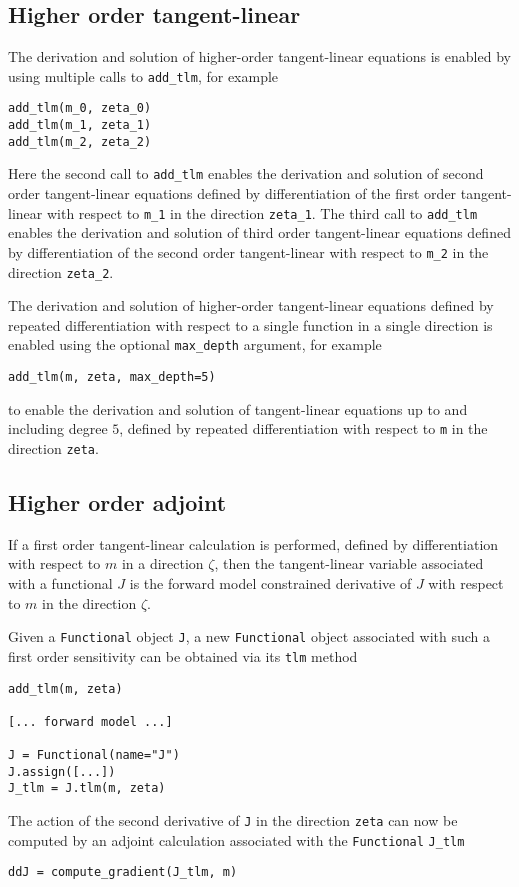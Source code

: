 \documentclass[11pt]{article}
\begin{document}
\subsection{Higher order tangent-linear}

The derivation and solution of higher-order tangent-linear equations is enabled
by using multiple calls to \texttt{add\_tlm}, for example
\begin{lstlisting}
add_tlm(m_0, zeta_0)
add_tlm(m_1, zeta_1)
add_tlm(m_2, zeta_2)
\end{lstlisting}
Here the second call to \texttt{add\_tlm} enables the derivation and solution
of second order tangent-linear equations defined by differentiation of the
first order tangent-linear with respect to \texttt{m\_1} in the direction
\texttt{zeta\_1}. The third call to \texttt{add\_tlm} enables the derivation
and solution of third order tangent-linear equations defined by differentiation
of the second order tangent-linear with respect to \texttt{m\_2} in the
direction \texttt{zeta\_2}.

The derivation and solution of higher-order tangent-linear equations defined by
repeated differentiation with respect to a single function in a single
direction is enabled using the optional \texttt{max\_depth} argument, for
example
\begin{lstlisting}
add_tlm(m, zeta, max_depth=5)
\end{lstlisting}
to enable the derivation and solution of tangent-linear equations up to and
including degree $5$, defined by repeated differentiation with respect to
\texttt{m} in the direction \texttt{zeta}.

\subsection{Higher order adjoint}\label{sect:higher_order_adjoint}

If a first order tangent-linear calculation is performed, defined by
differentiation with respect to $m$ in a direction $\zeta$, then the
tangent-linear variable associated with a functional $J$ is the forward model
constrained derivative of $J$ with respect to $m$ in the direction $\zeta$.

Given a \texttt{Functional} object \texttt{J}, a new \texttt{Functional} object
associated with such a first order sensitivity can be obtained via its
\texttt{tlm} method
\begin{lstlisting}
add_tlm(m, zeta)

[... forward model ...]

J = Functional(name="J")
J.assign([...])
J_tlm = J.tlm(m, zeta)
\end{lstlisting}
The action of the second derivative of \texttt{J} in the direction
\texttt{zeta} can now be computed by an adjoint calculation associated with the
\texttt{Functional} \texttt{J\_tlm}
\begin{lstlisting}
ddJ = compute_gradient(J_tlm, m)
\end{lstlisting}
\end{document}
